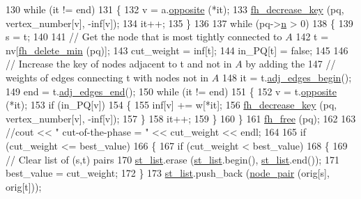 \begin{DoxyCode}
130         \textcolor{keywordflow}{while} (it != end)
131         \{
132             v = a.\mbox{\hyperlink{classnode_a13dbd1809a33a5efede64a359e53a363}{opposite}} (*it);
133             \mbox{\hyperlink{fheap_8c_aae5cdb4b5c64bb4597d36eb36d3d2c4b}{fh\_decrease\_key}} (pq, vertex\_number[v], -inf[v]);  
134             it++;
135         \}
136 
137         \textcolor{keywordflow}{while} (pq->\mbox{\hyperlink{structfheap_af369ea8f1202800c582fe570803fea9f}{n}} > 0)
138         \{
139             s = t;
140 
141             \textcolor{comment}{// Get the node that is most tightly connected to $A$}
142             t = nv[\mbox{\hyperlink{fheap_8c_a1103efc45c2f1814139914353e684f1a}{fh\_delete\_min}} (pq)];
143             cut\_weight = inf[t];
144             in\_PQ[t] = \textcolor{keyword}{false};
145 
146             \textcolor{comment}{// Increase the key of nodes adjacent to t and not in $A$ by adding the}
147             \textcolor{comment}{// weights of edges connecting t with nodes not in $A$ }
148             it = t.\mbox{\hyperlink{classnode_a788d3e932a5c164caa5ec82aa47551b2}{adj\_edges\_begin}}();
149             end = t.\mbox{\hyperlink{classnode_aa1e7887d29390297580769454f769ad6}{adj\_edges\_end}}();
150             \textcolor{keywordflow}{while} (it != end)
151             \{
152                 v = t.\mbox{\hyperlink{classnode_a13dbd1809a33a5efede64a359e53a363}{opposite}} (*it);
153                 \textcolor{keywordflow}{if} (in\_PQ[v])
154                 \{
155                     inf[v] += w[*it];
156                     \mbox{\hyperlink{fheap_8c_aae5cdb4b5c64bb4597d36eb36d3d2c4b}{fh\_decrease\_key}} (pq, vertex\_number[v], -inf[v]);  
157                 \}
158                 it++;
159             \}   
160         \}
161         \mbox{\hyperlink{fheap_8c_a11e6d24701acd9d4f1ffc8652dcfa340}{fh\_free}} (pq);
162 
163         \textcolor{comment}{//cout << "   cut-of-the-phase = " << cut\_weight << endl;}
164         
165         \textcolor{keywordflow}{if} (cut\_weight <= best\_value)
166         \{
167             \textcolor{keywordflow}{if} (cut\_weight < best\_value)
168             \{
169                 \textcolor{comment}{// Clear list of (s,t) pairs}
170                 \mbox{\hyperlink{classmincut_a1ef91db99ffc99172ba5e1de2c452c81}{st\_list}}.erase (\mbox{\hyperlink{classmincut_a1ef91db99ffc99172ba5e1de2c452c81}{st\_list}}.begin(), \mbox{\hyperlink{classmincut_a1ef91db99ffc99172ba5e1de2c452c81}{st\_list}}.end());
171                 best\_value = cut\_weight;
172             \}
173             \mbox{\hyperlink{classmincut_a1ef91db99ffc99172ba5e1de2c452c81}{st\_list}}.push\_back (\mbox{\hyperlink{mincut_8h_a649cc9b1d7fcef0834a532960bc441a0}{node\_pair}} (orig[s], orig[t]));

\end{DoxyCode}
